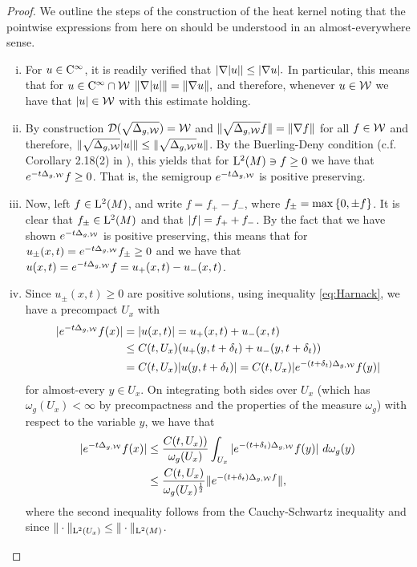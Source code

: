 \documentclass[a4paper, 12pt]{amsart}
\begin{document}
\begin{proof}
We outline the steps of the construction of the heat kernel
noting that the pointwise expressions from here on should be
understood in an almost-everywhere sense.
\begin{enumerate}[(i)]
\item For $u \in {\rm C}^{\infty}_{\rm {}}$, it is readily verified that 
	$| \nabla |u|| \leq | \nabla u|.$
	In particular, this means that 
	for $u \in {\rm C}^{\infty}_{\rm {}} \cap \mathcal{W}$
	$\| \nabla |u| \| = \| \nabla u \|,$
	and therefore, whenever $u \in \mathcal{W}$
	we have that $|u| \in \mathcal{W}$ 
	with this estimate holding.

\item 	By construction ${\mathcal{D}}(\sqrt{\Delta_{g, \mathcal{W}}}) = \mathcal{W}$
	and $\| \sqrt{\Delta_{g,\mathcal{W}}} f \| = \| \nabla f \|$
	for all $f \in \mathcal{W}$ and therefore, 
	$\| \sqrt{\Delta_{g, \mathcal{W}}} |u| \| 
		\leq \| \sqrt{\Delta_{g, \mathcal{W}}} u \|$. 
	By the Buerling-Deny condition (c.f.  Corollary 2.18(2) in  \cite{El-Maati}), 
	this yields that for ${\rm L}^{2}_{\rm {}}(M) \ni f \geq 0$
	we have that  $e^{-t \Delta_{g,\mathcal{W}}} f \geq 0$. That is, the semigroup 
	$e^{-t \Delta_{g,\mathcal{W}}}$ is positive preserving.  

\item Now, left $f \in {\rm L}^{2}_{\rm {}}(M)$, and write
	$f = f_+ - f_-$, where $f_{\pm} = \max\left\{0,\pm f\right\}$.
	It is clear that $f_{\pm} \in {\rm L}^{2}_{\rm {}}(M)$
	and that $|f| = f_+ + f_-$.
	By the fact that we have shown $e^{-t\Delta_{g,\mathcal{W}}}$ 
	is positive preserving, this means that
	for $u_{\pm} (x,t) = e^{-t\Delta_{g,\mathcal{W}}} f_{\pm} \geq 0$	
	and we have that $u(x,t) = e^{-t \Delta_{g,\mathcal{W}}} f = u_+(x,t) - u_-(x,t)$.

\item  Since $u_{\pm}(x,t) \geq 0$ are positive solutions,
	using inequality \eqref{eq:Harnack}, we have a precompact $U_x$ 
	with 
	\begin{align*} 
	|e^{-t \Delta_{g,\mathcal{W}}}f(x)|  &= |u(x,t)| = u_+(x,t) + u_-(x,t) \\
		&\leq C(t,U_x) (u_+(y,t+\delta_t) + u_-(y,t+\delta_t)) \\
		&= C(t,U_x) |u(y,t + \delta_t)|
		= C(t,U_x)  |e^{-(t + \delta_t) \Delta_{g,\mathcal{W}}}f(y)|
	\end{align*} 
	for almost-every $y \in U_x$.
	On integrating both sides over $U_x$ (which has $\omega_g(U_x) < \infty$
	by precompactness and the properties of the measure $\omega_g$) with respect
	to the variable $y$,
	we have that
	\begin{align*} 
	|e^{-t \Delta_{g,\mathcal{W}}}f(x)| 
		&\leq \frac{C(t,U_x))}{\omega_g(U_x)} \int_{U_x} |e^{-(t + \delta_t) \Delta_{g,\mathcal{W}}}f(y)|\ d\omega_g(y) \\
		&\leq \frac{C(t,U_x)}{\omega_g(U_x)^{\frac{1}{2}}} \| e^{-(t + \delta_t) \Delta_{g,\mathcal{W}}f} \|,
	\end{align*}
	where the second inequality follows from the Cauchy-Schwartz
	inequality and since $\| \cdot \|_{{\rm L}^{2}_{\rm {}}(U_x)} \leq \| \cdot \|_{{\rm L}^{2}_{\rm {}}(M)}$.


\end{enumerate}
\end{proof}
\end{document}

